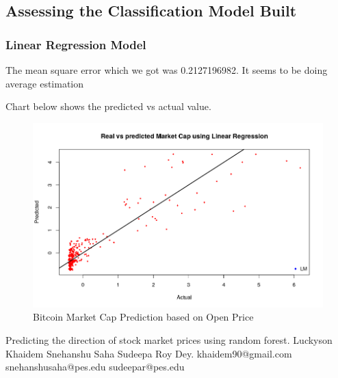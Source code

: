 \documentclass{article}
\begin{document}
\subsection {Assessing the  Classification Model Built}

\subsubsection{Linear Regression Model}

The mean square error which we got was  0.2127196982. It seems to be doing average estimation

Chart below shows the predicted vs actual value.

\begin{figure}
	\centering
	\includegraphics[width=\linewidth]{charts/bitcoin_market_cap_using_LR}
	\caption{Bitcoin Market Cap Prediction based on Open Price}
	\label{fig:Bitcoin Market Cap Prediction}
\end{figure}

\begin{thebibliography}{References}
	Predicting the direction of stock market prices
	using random forest. Luckyson Khaidem Snehanshu Saha Sudeepa Roy Dey. khaidem90@gmail.com snehanshusaha@pes.edu sudeepar@pes.edu
	
\end{thebibliography}
\end{document}
